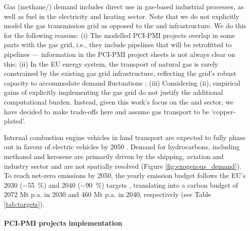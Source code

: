 \documentclass[final,5p,times,twocolumn,sort&compress]{elsarticle}
\begin{document}
Gas (methane/) demand includes direct use in gas-based industrial processes, as well as fuel in the electricity and heating sector. Note that we do not explicitly model the gas transmission grid as opposed to the  and  infrastructure. We do this for the following reasons: (i) The modelled PCI-PMI projects overlap in some parts with the gas grid, i.e., they include  pipelines that will be retrofitted to  pipelines --- information in the PCI-PMI project sheets is not always clear on this; (ii) In the EU energy system, the transport of natural gas is rarely constrained by the existing gas grid infrastructure, reflecting the grid's robust capacity to accommodate demand fluctuations \cite{riepinModellingUncertaintyCoupled2021}; (iii) Considering (ii), empirical gains of explicitly implementing the gas grid do not justify the additional computational burden. 
Instead, given this work's focus on the  and  sector, we have decided to make trade-offs here and assume gas transport to be `copper-plated'.

Internal combustion engine vehicles in land transport are expected to fully phase out in favour of electric vehicles by 2050 \cite{zeyenShiftingBurdensHow2025a}. Demand for hydrocarbons, including methanol and kerosene are primarily driven by the shipping, aviation and industry sector and are not spatially resolved (Figure \ref{fig:exogenous_demand}).
To reach net-zero  emissions by 2050, the yearly emission budget follows the EU's 2030 (\SI{-55}{\percent}) and 2040 (\SI{-90}{\percent}) targets \cite{europeancommissionFit55Delivering2021, europeancommission.directorategeneralforclimateaction.IndepthReportResults2024}, translating into a carbon budget of 2072 Mt p.a. in 2030 and 460 Mt p.a. in 2040, respectively (see Table \ref{tab:targets}).

\paragraph{PCI-PMI projects implementation}
\label{sec:pci-pmi_projects_implementation}
\end{document}
